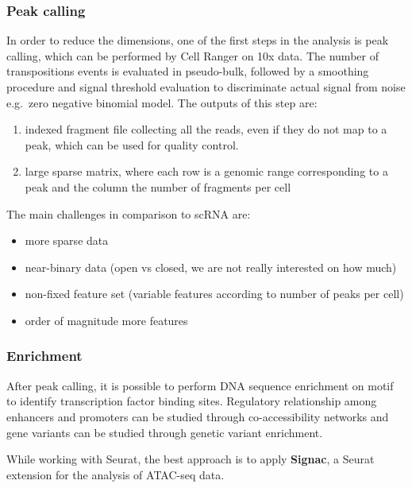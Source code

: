 \hypertarget{peak-calling}{%
\subsubsection{Peak calling}\label{peak-calling}}

In order to reduce the dimensions, one of the first steps in the
analysis is peak calling, which can be performed by Cell Ranger on 10x
data. The number of transpositions events is evaluated in pseudo-bulk,
followed by a smoothing procedure and signal threshold evaluation to
discriminate actual signal from noise e.g.~zero negative binomial model.
The outputs of this step are:

\begin{enumerate}
\def\labelenumi{\arabic{enumi}.}
\tightlist
\item
  indexed fragment file collecting all the reads, even if they do not
  map to a peak, which can be used for quality control.
\item
  large sparse matrix, where each row is a genomic range corresponding
  to a peak and the column the number of fragments per cell
\end{enumerate}

The main challenges in comparison to scRNA are:

\begin{itemize}
\tightlist
\item
  more sparse data
\item
  near-binary data (open vs closed, we are not really interested on how
  much)
\item
  non-fixed feature set (variable features according to number of peaks
  per cell)
\item
  order of magnitude more features
\end{itemize}

\hypertarget{enrichment}{%
\subsubsection{Enrichment}\label{enrichment}}

After peak calling, it is possible to perform DNA sequence enrichment on
motif to identify transcription factor binding sites. Regulatory
relationship among enhancers and promoters can be studied through
co-accessibility networks and gene variants can be studied through
genetic variant enrichment.

While working with Seurat, the best approach is to apply
\textbf{Signac}, a Seurat extension for the analysis of ATAC-seq data.


